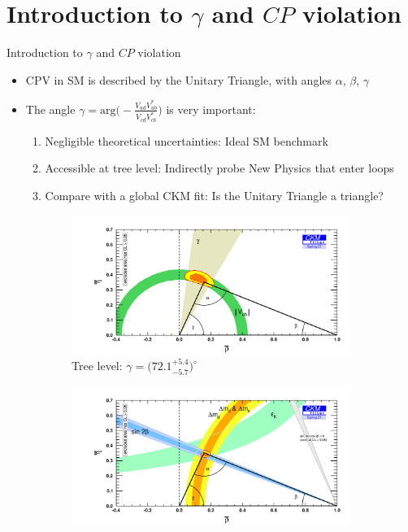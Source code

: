 \documentclass[xcolor={dvipsnames}]{beamer}
\begin{document}
\section{Introduction to \texorpdfstring{$\gamma$}{gamma} and \texorpdfstring{$C\!P$}{CP} violation}
\begin{frame}{Introduction to $\gamma$ and $C\!P$ violation}
  \begin{itemize}
    \setlength\itemsep{0.3em}
    \item{CPV in SM is described by the Unitary Triangle, with angles $\alpha$, $\beta$, $\gamma$}
    \item{The angle $\gamma = \text{arg}\Big(-\frac{V^{\phantom{*}}_{ud}V^*_{ub}}{V^{\phantom{*}}_{cd}V^*_{cb}}\Big)$ is very important:}
    \begin{enumerate}
    \setlength\itemsep{0.2em}
      \item{Negligible theoretical uncertainties: Ideal SM benchmark}
      \item{Accessible at tree level: Indirectly probe New Physics that enter loops}
      \item{Compare with a global CKM fit: Is the Unitary Triangle a triangle?}
    \end{enumerate}
  \end{itemize}
  \vspace{-0.2cm}
  \begin{figure}
    \centering
    \begin{subfigure}{0.5\textwidth}
      \centering
      \includegraphics[width = 1.0\textwidth]{Plots/ckmfitter_tree.png}
      \caption{Tree level: $\gamma = \big(72.1^{+5.4}_{-5.7}\big)^\circ$}
    \end{subfigure}%
    \begin{subfigure}{0.5\textwidth}
      \centering
      \includegraphics[width = 1.0\textwidth]{Plots/ckmfitter_loop.png}

\end{subfigure}
\end{figure}
\end{frame}
\end{document}
